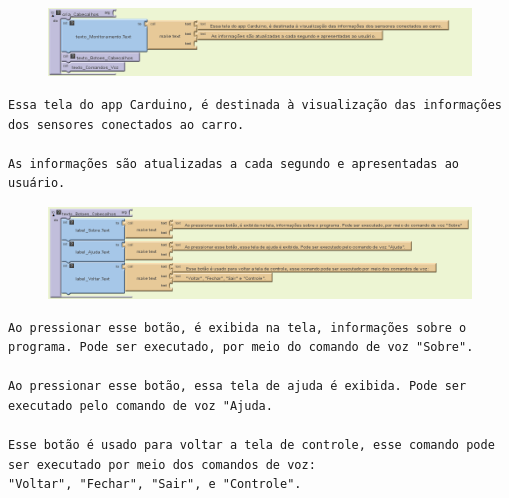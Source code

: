 \documentclass[portugues, brazil, a4paper,12pt]{article}
\begin{document}
\begin{figure}[H]
	\centering
	\includegraphics[scale=.7]{img/ajudaMonitoramento/cabecalho.png}

\end{figure}
\begin{verbatim}
Essa tela do app Carduino, é destinada à visualização das informações
dos sensores conectados ao carro.

As informações são atualizadas a cada segundo e apresentadas ao usuário.

\end{verbatim}


\begin{figure}[H]
	\centering
	\includegraphics[scale=.6]{img/ajudaMonitoramento/bCabecalho.png}

\end{figure}
\begin{verbatim}
Ao pressionar esse botão, é exibida na tela, informações sobre o
programa. Pode ser executado, por meio do comando de voz "Sobre".

Ao pressionar esse botão, essa tela de ajuda é exibida. Pode ser
executado pelo comando de voz "Ajuda.

Esse botão é usado para voltar a tela de controle, esse comando pode 
ser executado por meio dos comandos de voz:
"Voltar", "Fechar", "Sair", e "Controle".

\end{verbatim}
\end{document}
